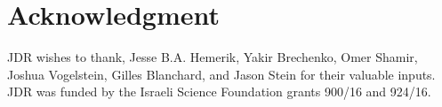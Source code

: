 \documentclass[]{bio}
\begin{document}
\section*{Acknowledgment}
JDR wishes to thank, Jesse B.A. Hemerik, Yakir Brechenko, Omer Shamir, Joshua Vogelstein, Gilles Blanchard, and Jason Stein for their valuable inputs. 
JDR was funded by the Israeli Science Foundation grants 900/16 and 924/16. 


\newpage


\end{document}
